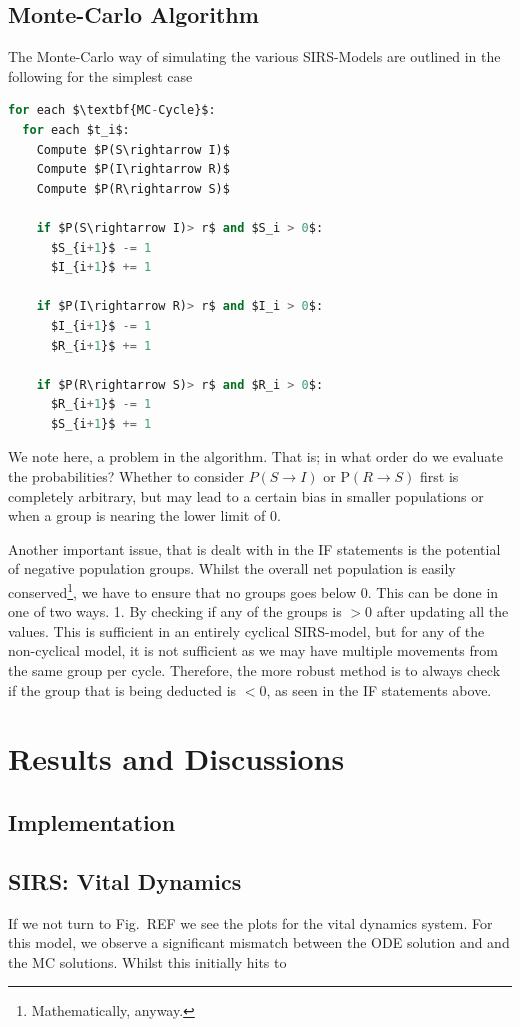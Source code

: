\documentclass[10pt,showpacs,preprintnumbers,amsmath,amssymb,nofootinbib,aps,prl,twocolumn,groupedaddress,superscriptaddress,showkeys]{revtex4-1}
\begin{document}
  \subsection{Monte-Carlo Algorithm}

  The Monte-Carlo way of simulating the various SIRS-Models are outlined in the following
  for the simplest case
\begin{lstlisting}[mathescape=true, language=python, title=SIRS Monte-Carlo]
for each $\textbf{MC-Cycle}$:
  for each $t_i$:
    Compute $P(S\rightarrow I)$
    Compute $P(I\rightarrow R)$
    Compute $P(R\rightarrow S)$

    if $P(S\rightarrow I)> r$ and $S_i > 0$:
      $S_{i+1}$ -= 1
      $I_{i+1}$ += 1

    if $P(I\rightarrow R)> r$ and $I_i > 0$:
      $I_{i+1}$ -= 1
      $R_{i+1}$ += 1

    if $P(R\rightarrow S)> r$ and $R_i > 0$:
      $R_{i+1}$ -= 1
      $S_{i+1}$ += 1
\end{lstlisting}
  
  We note here, a problem in the algorithm. That is; in what order do we evaluate the probabilities?
  Whether to consider $P(S\rightarrow I)$ or P$(R\rightarrow S)$ first is completely arbitrary, but may lead to a certain bias in smaller populations or when a group is nearing the lower limit of 0.

  Another important issue, that is dealt with in the IF statements is the potential of negative population groups. Whilst the overall net population is easily conserved\footnote{Mathematically, anyway.}, we have to ensure that no groups goes below 0. This can be done in one of two ways. 1. By checking if any of the groups is $>0$ after updating all the values. This is sufficient in an entirely cyclical SIRS-model, but for any of the non-cyclical model, it is not sufficient as we may have multiple movements from the same group per cycle. Therefore, the more robust method is to always check if the group that is being deducted is $<0$, as seen in the IF statements above.
  

\section{Results and Discussions}
  \subsection{Implementation}

  \subsection{SIRS: Vital Dynamics}
    If we not turn to Fig.~REF we see the plots for the vital dynamics system.
    For this model, we observe a significant mismatch between the ODE solution and
    and the MC solutions. Whilst this initially hits to 
\end{document}
